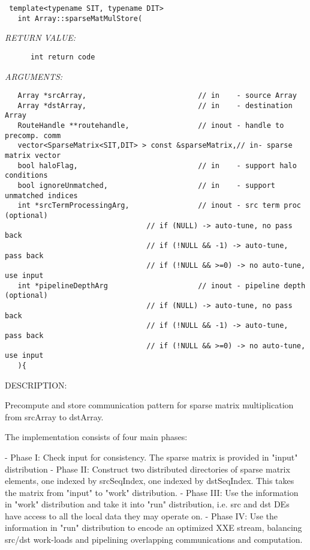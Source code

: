   
\begin{verbatim} template<typename SIT, typename DIT>
   int Array::sparseMatMulStore(\end{verbatim}{\em RETURN VALUE:}
\begin{verbatim}      int return code\end{verbatim}{\em ARGUMENTS:}
\begin{verbatim}   Array *srcArray,                          // in    - source Array
   Array *dstArray,                          // in    - destination Array
   RouteHandle **routehandle,                // inout - handle to precomp. comm
   vector<SparseMatrix<SIT,DIT> > const &sparseMatrix,// in- sparse matrix vector
   bool haloFlag,                            // in    - support halo conditions
   bool ignoreUnmatched,                     // in    - support unmatched indices
   int *srcTermProcessingArg,                // inout - src term proc (optional)
                                 // if (NULL) -> auto-tune, no pass back
                                 // if (!NULL && -1) -> auto-tune, pass back
                                 // if (!NULL && >=0) -> no auto-tune, use input
   int *pipelineDepthArg                     // inout - pipeline depth (optional)
                                 // if (NULL) -> auto-tune, no pass back
                                 // if (!NULL && -1) -> auto-tune, pass back
                                 // if (!NULL && >=0) -> no auto-tune, use input
   ){\end{verbatim}
{\sf DESCRIPTION:\\ }


    Precompute and store communication pattern for sparse matrix multiplication
    from srcArray to dstArray.
  
    The implementation consists of four main phases:
  
    - Phase I:    Check input for consistency. The sparse matrix is provided in
                  "input" distribution
    - Phase II:   Construct two distributed directories of sparse matrix
                  elements, one indexed by srcSeqIndex, one indexed by
                  dstSeqIndex. This takes the matrix from "input" to "work"
                  distribution.
    - Phase III:  Use the information in "work" distribution and take it into
                  "run" distribution, i.e. src and dst DEs have access to all
                  the local data they may operate on.
    - Phase IV:   Use the information in "run" distribution to encode an
                  optimized XXE stream, balancing src/dst work-loads and
                  pipelining overlapping communications and computation.
   
